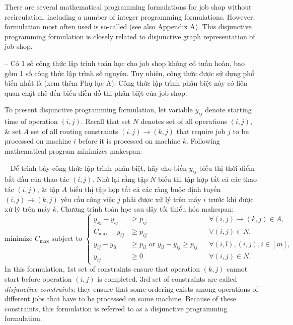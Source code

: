 \documentclass{article}
\begin{document}
\begin{itemize}
\begin{itemize}
        There are several mathematical programming formulations for job shop without recirculation, including a number of integer programming formulations. However, formulation most often used is so-called  (see also Appendix A). This disjunctive programming formulation is closely related to disjunctive graph representation of job shop.

        -- Có 1 số công thức lập trình toán học cho job shop không có tuần hoàn, bao gồm 1 số công thức lập trình số nguyên. Tuy nhiên, công thức được sử dụng phổ biến nhất là  (xem thêm Phụ lục A). Công thức lập trình phân biệt này có liên quan chặt chẽ đến biểu diễn đồ thị phân biệt của job shop.

        To present disjunctive programming formulation, let variable $y_{ij}$ denote starting time of operation $(i,j)$. Recall that set $N$ denotes set of all operations $(i,j)$, \& set $A$ set of all routing constraints $(i,j)\to(k,j)$ that require job $j$ to be processed on machine $i$ before it is processed on machine $k$. Following mathematical program minimizes makespan:

        -- Để trình bày công thức lập trình phân biệt, hãy cho biến $y_{ij}$ biểu thị thời điểm bắt đầu của thao tác $(i,j)$. Nhớ lại rằng tập $N$ biểu thị tập hợp tất cả các thao tác $(i,j)$, \& tập $A$ biểu thị tập hợp tất cả các ràng buộc định tuyến $(i,j)\to(k,j)$ yêu cầu công việc $j$ phải được xử lý trên máy $i$ trước khi được xử lý trên máy $k$. Chương trình toán học sau đây tối thiểu hóa makespan:
        \begin{equation*}
            \mbox{minimize } C_{\max}\mbox{ subject to }\left\{\begin{split}
                y_{kj} - y_{ij}&\ge p_{ij}&&\forall(i,j)\to(k,j)\in A,\\
                C_{\max} - y_{ij}&\ge p_{ij}&&\forall(i,j)\in N,\\
                y_{ij} - y_{il}&\ge p_{il}\mbox{ or } y_{il} - y_{ij}\ge p_{ij}&&\forall(i,l),(i,j),i\in[m],\\
                y_{ij}&\ge0&&\forall(i,j)\in N.
            \end{split}\right.
        \end{equation*}
        In this formulation, 1st set of constraints ensure that operation $(k,j)$ cannot start before operation $(i,j)$ is completed. 3rd set of constraints are called {\it disjunctive constraints}; they ensure that some ordering exists among operations of different jobs that have to be processed on same machine. Because of these constraints, this formulation is referred to as a disjunctive programming formulation.


\end{itemize}
\end{itemize}
\end{document}
